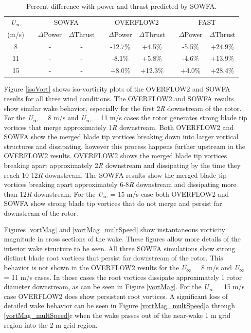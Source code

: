 \begin{table}[htbp]
\centering
\begin{tabular}{c c c c c c c c c c}
\hline
\emph{U$_{\infty}$} & & \multicolumn{2}{c}{SOWFA} & & \multicolumn{2}{c}{OVERFLOW2} & & \multicolumn{2}{c}{FAST}\\
\cline{3-4} \cline{6-7} \cline{9-10} 
 {(m/s)} & & $\Delta$Power & $\Delta$Thrust & & $\Delta$Power & $\Delta$Thrust & & $\Delta$Power & $\Delta$Thrust \\
\hline
8   & & - & - & & -12.7\% & +4.5\%  & & -5.5\% & +24.9\%\\
11  & & - & - & & -8.1\%  & +5.8\%  & & -4.6\% & +13.9\%\\
15  & & - & - & & +8.0\%  & +12.3\% & & +4.0\% & +28.4\%\\
\hline
\end{tabular}
\caption{ Percent difference with power and thrust predicted by SOWFA.}
\label{Table4}
\end{table}

Figure \ref{isoVort} shows iso-vorticity plots of the OVERFLOW2 and SOWFA results for all three wind conditions. The OVERFLOW2 and SOWFA results show similar wake behavior, especially for the first 2\emph{R} downstream of the rotor. For the \emph{U$_{\infty}$}  = 8 m/s and \emph{U$_{\infty}$}  = 11 m/s cases the rotor generates strong blade tip vortices that merge approximately 1\emph{R} downstream. Both OVERFLOW2 and SOWFA show the merged blade tip vortices breaking down into larger vortical structures and dissipating, however this process happens further upstream in the OVERFLOW2 results. OVERFLOW2 shows the merged blade tip vortices breaking apart approximately 2\emph{R} downstream and dissipating by the time they reach 10-12\emph{R} downstream. The SOWFA results show the merged blade tip vortices breaking apart approximately 6-8\emph{R} downstream and dissipating more than 12\emph{R} downstream. For the \emph{U$_{\infty}$}  = 15 m/s case both OVERFLOW2 and SOWFA show strong blade tip vortices that do not merge and persist far downstream of the rotor.




Figures \ref{vortMag} and \ref{vortMag_multSpeed} show instantaneous vorticity magnitude in cross sections of the wake. These figures allow more details of the interior wake structure to be seen. All three SOWFA simulations show strong distinct blade root vortices that persist far downstream of the rotor. This behavior is not shown in the OVERFLOW2 results for the \emph{U$_{\infty}$}  = 8 m/s and \emph{U$_{\infty}$}  = 11 m/s cases. In those cases the root vortices dissipate approximately 1 rotor diameter downstream, as can be seen in Figure \ref{vortMag}. For the \emph{U$_{\infty}$}  = 15 m/s case OVERFLOW2 does show persistent root vortices. A significant loss of detailed wake behavior can be seen in Figure \ref{vortMag_multSpeed}a through \ref{vortMag_multSpeed}c when the wake passes out of the near-wake 1 m grid region into the 2 m grid region. 



